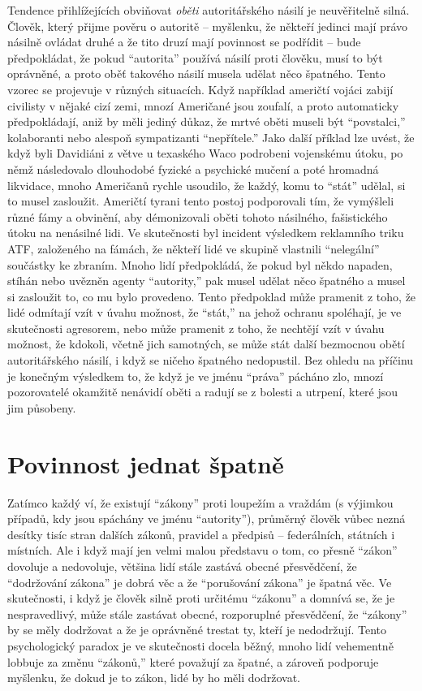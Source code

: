 \documentclass{book}
\begin{document}
Tendence přihlížejících obviňovat \emph{oběti} autoritářského násilí je neuvěřitelně silná. Člověk, který přijme pověru o autoritě -- myšlenku, že někteří jedinci mají právo násilně ovládat druhé a že tito druzí mají povinnost se podřídit -- bude předpokládat, že pokud \enquote{autorita} používá násilí proti člověku, musí to být oprávněné, a proto oběť takového násilí musela udělat něco špatného. Tento vzorec se projevuje v různých situacích. Když například američtí vojáci zabijí civilisty v nějaké cizí zemi, mnozí Američané jsou zoufalí, a proto automaticky předpokládají, aniž by měli jediný důkaz, že mrtvé oběti museli být \enquote{povstalci,} kolaboranti nebo alespoň sympatizanti \enquote{nepřítele.} Jako další příklad lze uvést, že když byli Davidiáni z větve u texaského Waco podrobeni vojenskému útoku, po němž následovalo dlouhodobé fyzické a psychické mučení a poté hromadná likvidace, mnoho Američanů rychle usoudilo, že každý, komu to \enquote{stát} udělal, si to musel zasloužit. Američtí tyrani tento postoj podporovali tím, že vymýšleli různé fámy a obvinění, aby démonizovali oběti tohoto násilného, fašistického útoku na nenásilné lidi. Ve skutečnosti byl incident výsledkem reklamního triku ATF, založeného na fámách, že někteří lidé ve skupině vlastnili \enquote{nelegální} součástky ke zbraním. Mnoho lidí předpokládá, že pokud byl někdo napaden, stíhán nebo uvězněn agenty \enquote{autority,} pak musel udělat něco špatného a musel si zasloužit to, co mu bylo provedeno. Tento předpoklad může pramenit z toho, že lidé odmítají vzít v úvahu možnost, že \enquote{stát,} na jehož ochranu spoléhají, je ve skutečnosti agresorem, nebo může pramenit z toho, že nechtějí vzít v úvahu možnost, že kdokoli, včetně jich samotných, se může stát další bezmocnou obětí autoritářského násilí, i když se ničeho špatného nedopustil. Bez ohledu na příčinu je konečným výsledkem to, že když je ve jménu \enquote{práva} pácháno zlo, mnozí pozorovatelé okamžitě nenávidí oběti a radují se z bolesti a utrpení, které jsou jim působeny.

\section{Povinnost jednat špatně}

Zatímco každý ví, že existují \enquote{zákony} proti loupežím a vraždám (s výjimkou případů, kdy jsou spáchány ve jménu \enquote{autority}), průměrný člověk vůbec nezná desítky tisíc stran dalších zákonů, pravidel a předpisů -- federálních, státních i místních. Ale i když mají jen velmi malou představu o tom, co přesně \enquote{zákon} dovoluje a nedovoluje, většina lidí stále zastává obecné přesvědčení, že \enquote{dodržování zákona} je dobrá věc a že \enquote{porušování zákona} je špatná věc. Ve skutečnosti, i když je člověk silně proti určitému \enquote{zákonu} a domnívá se, že je nespravedlivý, může stále zastávat obecné, rozporuplné přesvědčení, že \enquote{zákony} by se měly dodržovat a že je oprávněné trestat ty, kteří je nedodržují. Tento psychologický paradox je ve skutečnosti docela běžný, mnoho lidí vehementně lobbuje za změnu \enquote{zákonů,} které považují za špatné, a zároveň podporuje myšlenku, že dokud je to zákon, lidé by ho měli dodržovat.
\end{document}
